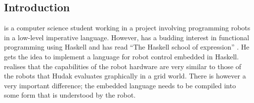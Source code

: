 



% 






% 



\subsection{Introduction}
\studname{} is a computer science student working in a project involving programming 
robots in a low-level imperative language. However, \studname{} has a budding 
interest in functional programming using Haskell and has read ``The Haskell 
school of expression'' . He gets the idea to implement 
a language for robot control embedded in Haskell. \studname{} realises that the 
capabilities of the robot hardware are very similar to those of the 
robots that Hudak evaluates graphically in a grid world. There is however 
a very important difference; the embedded language needs to be compiled into 
some form that is understood by the robot. 


